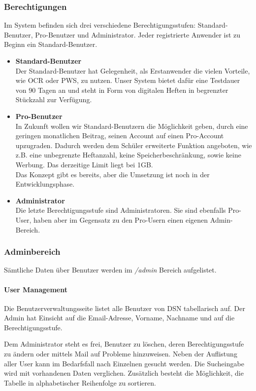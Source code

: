 \subsubsection{Berechtigungen}
Im System befinden sich drei verschiedene Berechtigungsstufen: Standard-Benutzer, Pro-Benutzer und Administrator. Jeder registrierte Anwender ist zu Beginn ein Standard-Benutzer.

\begin{itemize}
\item \textbf{Standard-Benutzer}\\ Der Standard-Benutzer hat Gelegenheit, als Erstanwender die vielen Vorteile, wie OCR oder PWS, zu nutzen. Unser System bietet dafür eine Testdauer von 90 Tagen an und steht in Form von digitalen Heften in begrenzter Stückzahl zur Verfügung.
\item \textbf{Pro-Benutzer}\\ In Zukunft wollen wir Standard-Benutzern die Möglichkeit geben, durch eine geringen monatlichen Beitrag, seinen Account auf einen Pro-Account upzugraden. Dadurch werden dem Schüler erweiterte Funktion angeboten, wie z.B. eine unbegrenzte Heftanzahl, keine Speicherbeschränkung, sowie keine Werbung. Das derzeitige Limit liegt bei 1GB.\\
Das Konzept gibt es bereits, aber die Umsetzung ist noch in der Entwicklungsphase.
\item \textbf{Administrator}\\ Die letzte Berechtigungsstufe sind Administratoren. Sie sind ebenfalls Pro-User, haben aber im Gegensatz zu den Pro-Usern einen eigenen Admin-Bereich.
\end{itemize}

\subsubsection{Adminbereich}
Sämtliche Daten über Benutzer werden im \textit{/admin} Bereich aufgelistet.
\paragraph{User Management}
Die Benutzerverwaltungsseite listet alle Benutzer von DSN tabellarisch auf. Der Admin hat Einsicht auf die Email-Adresse, Vorname, Nachname und auf die Berechtigungsstufe.

\newpage

Dem Administrator steht es frei, Benutzer zu löschen, deren Berechtigungsstufe zu ändern oder mittels Mail auf Probleme hinzuweisen. Neben der Auflistung aller User kann im Bedarfsfall nach Einzelnen gesucht werden. Die Sucheingabe wird mit vorhandenen Daten verglichen. Zusätzlich besteht die Möglichkeit, die Tabelle in alphabetischer Reihenfolge zu sortieren.

